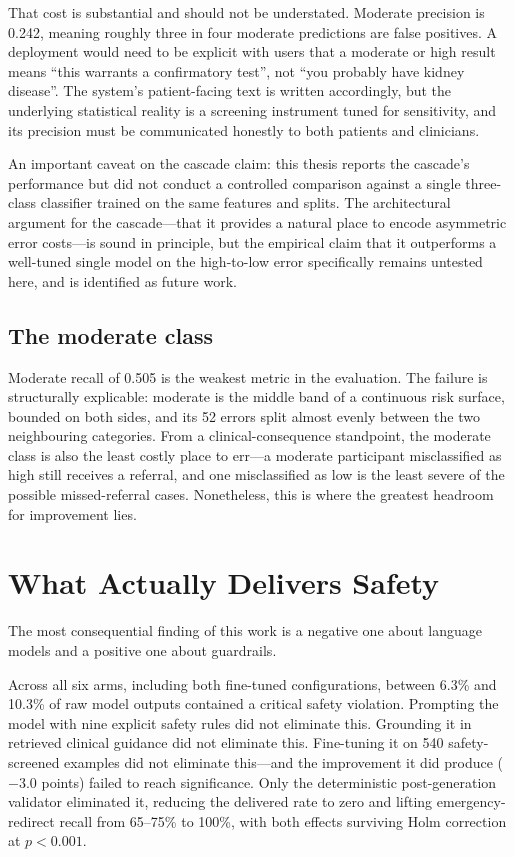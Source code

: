 That cost is substantial and should not be understated. Moderate precision is
0.242, meaning roughly three in four moderate predictions are false positives.
A deployment would need to be explicit with users that a moderate or high result
means ``this warrants a confirmatory test'', not ``you probably have kidney
disease''. The system's patient-facing text is written accordingly, but the
underlying statistical reality is a screening instrument tuned for sensitivity,
and its precision must be communicated honestly to both patients and clinicians.

An important caveat on the cascade claim: this thesis reports the cascade's
performance but did not conduct a controlled comparison against a single
three-class classifier trained on the same features and splits. The architectural
argument for the cascade---that it provides a natural place to encode asymmetric
error costs---is sound in principle, but the empirical claim that it outperforms
a well-tuned single model on the high-to-low error specifically remains untested
here, and is identified as future work.

\subsection{The moderate class}

Moderate recall of 0.505 is the weakest metric in the evaluation. The failure is
structurally explicable: moderate is the middle band of a continuous risk
surface, bounded on both sides, and its 52 errors split almost evenly between
the two neighbouring categories. From a clinical-consequence standpoint, the
moderate class is also the least costly place to err---a moderate participant
misclassified as high still receives a referral, and one misclassified as low is
the least severe of the possible missed-referral cases. Nonetheless, this is
where the greatest headroom for improvement lies.

\section{What Actually Delivers Safety}
\label{sec:disc_safety}

The most consequential finding of this work is a negative one about language
models and a positive one about guardrails.

Across all six arms, including both fine-tuned configurations, between 6.3\% and
10.3\% of raw model outputs contained a critical safety violation. Prompting the
model with nine explicit safety rules did not eliminate this. Grounding it in
retrieved clinical guidance did not eliminate this. Fine-tuning it on 540
safety-screened examples did not eliminate this---and the improvement it did
produce ($-3.0$ points) failed to reach significance. Only the deterministic
post-generation validator eliminated it, reducing the delivered rate to zero and
lifting emergency-redirect recall from 65--75\% to 100\%, with both effects
surviving Holm correction at $p<0.001$.


